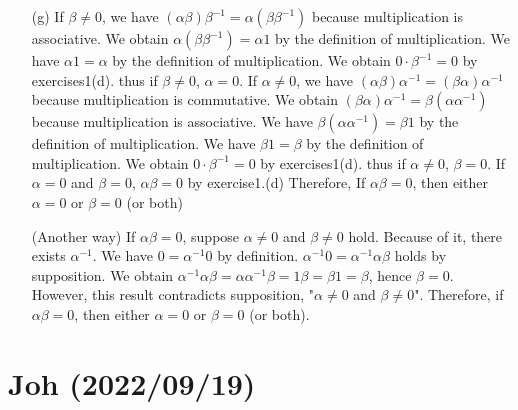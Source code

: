 \documentclass{article}
\begin{document}
\begin{itemize}
  \item[(g)]If $\beta \neq 0$, we have $(\alpha\beta)\beta^{-1}=\alpha(\beta\beta^{-1})$ because multiplication is associative.
    We obtain $\alpha(\beta\beta^{-1}) = \alpha1$ by the definition of multiplication.
    We have $\alpha1 = \alpha$ by the definition of multiplication.
    We obtain $0\cdot\beta^{-1} = 0$ by exercises1(d).
    thus if $\beta \neq 0$, $\alpha = 0$.
    If $\alpha \neq 0$, we have $(\alpha\beta)\alpha^{-1} = (\beta\alpha)\alpha^{-1}$ because multiplication is commutative.
    We obtain $(\beta\alpha)\alpha^{-1} = \beta(\alpha\alpha^{-1})$ because multiplication is associative.
    We have $\beta(\alpha\alpha^{-1}) = \beta1$  by the definition of multiplication.
    We have $\beta1 = \beta$ by the definition of multiplication.
    We obtain $0\cdot\beta^{-1} = 0$ by exercises1(d).
    thus if $\alpha \neq 0$, $\beta = 0$.
    If $\alpha = 0$ and $\beta = 0$, $\alpha\beta = 0$ by exercise1.(d)
    Therefore, If $\alpha\beta = 0$, then either $\alpha = 0$ or $\beta = 0$ (or both)

    (Another way)
    If $\alpha\beta = 0$,
    suppose $\alpha \neq 0$ and $\beta \neq 0$ hold.
    Because of it, there exists $\alpha^{-1}$.
    We have $0 = \alpha^{-1}0$ by definition.
    $\alpha^{-1}0 = \alpha^{-1}\alpha\beta$ holds by supposition.
    We obtain $\alpha^{-1}\alpha\beta = \alpha\alpha^{-1}\beta = 1\beta = \beta1 = \beta$,
    hence $\beta = 0$.
    However, this result contradicts supposition, "$\alpha \neq 0$ and $\beta \neq 0$".
    Therefore, if $\alpha\beta = 0$, then either $\alpha = 0$ or $\beta = 0$ (or both).
    
\end{itemize}
\section{Joh (2022/09/19)}
\end{document}
